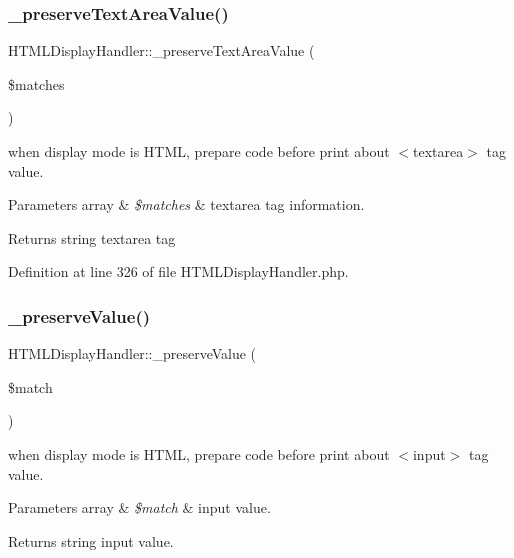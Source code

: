 \subsubsection{\texorpdfstring{\+\_\+preserve\+Text\+Area\+Value()}{\_preserveTextAreaValue()}}
{\footnotesize\ttfamily H\+T\+M\+L\+Display\+Handler\+::\+\_\+preserve\+Text\+Area\+Value (\begin{DoxyParamCaption}\item[{}]{\$matches }\end{DoxyParamCaption})}

when display mode is H\+T\+ML, prepare code before print about $<$textarea$>$ tag value. 
\begin{DoxyParams}[1]{Parameters}
array & {\em \$matches} & textarea tag information. \\
\hline
\end{DoxyParams}
\begin{DoxyReturn}{Returns}
string textarea tag 
\end{DoxyReturn}


Definition at line 326 of file H\+T\+M\+L\+Display\+Handler.\+php.

\mbox{\label{classHTMLDisplayHandler_aa99a0e119ab322b0e323d1109f668a35}} 
\subsubsection{\texorpdfstring{\+\_\+preserve\+Value()}{\_preserveValue()}}
{\footnotesize\ttfamily H\+T\+M\+L\+Display\+Handler\+::\+\_\+preserve\+Value (\begin{DoxyParamCaption}\item[{}]{\$match }\end{DoxyParamCaption})}

when display mode is H\+T\+ML, prepare code before print about $<$input$>$ tag value. 
\begin{DoxyParams}[1]{Parameters}
array & {\em \$match} & input value. \\
\hline
\end{DoxyParams}
\begin{DoxyReturn}{Returns}
string input value. 
\end{DoxyReturn}


